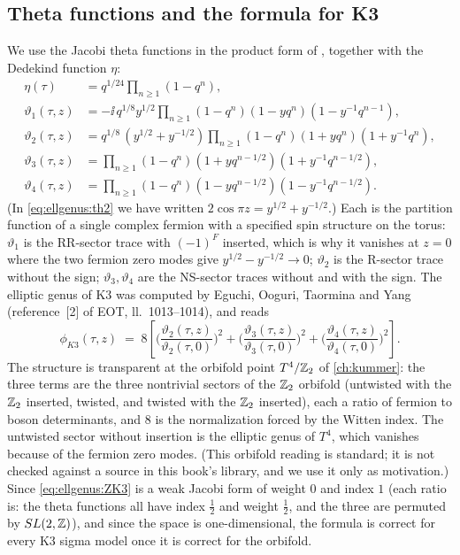 \subsection{Theta functions and the formula for K3}

We use the Jacobi theta functions in the product form of , together with the Dedekind function $\eta$:
\begin{align}
 \eta(\tau)&=q^{1/24}\prod_{n\ge1}(1-q^n),\label{eq:ellgenus:eta}\\
 \vartheta_1(\tau,z)&=-\ii\,q^{1/8}y^{1/2}\prod_{n\ge1}(1-q^n)(1-yq^n)(1-y^{-1}q^{n-1}),
   \label{eq:ellgenus:th1}\\
 \vartheta_2(\tau,z)&=q^{1/8}\,(y^{1/2}+y^{-1/2})\prod_{n\ge1}(1-q^n)(1+yq^n)(1+y^{-1}q^n),
   \label{eq:ellgenus:th2}\\
 \vartheta_3(\tau,z)&=\prod_{n\ge1}(1-q^n)(1+yq^{n-1/2})(1+y^{-1}q^{n-1/2}),\label{eq:ellgenus:th3}\\
 \vartheta_4(\tau,z)&=\prod_{n\ge1}(1-q^n)(1-yq^{n-1/2})(1-y^{-1}q^{n-1/2}).\label{eq:ellgenus:th4}
\end{align}
(In \eqref{eq:ellgenus:th2} we have written $2\cos\pi z=y^{1/2}+y^{-1/2}$.) Each is the
partition function of a single complex fermion with a specified spin structure on the torus:
$\vartheta_1$ is the RR-sector trace with $(-1)^F$ inserted, which is why it vanishes at $z=0$
where the two fermion zero modes give $y^{1/2}-y^{-1/2}\to0$; $\vartheta_2$ is the R-sector
trace without the sign; $\vartheta_3,\vartheta_4$ are the NS-sector traces without and with
the sign. The elliptic genus of K3 was computed by Eguchi, Ooguri, Taormina and Yang
(reference~[2] of EOT, ll.~1013--1014), and reads 
\begin{equation}\label{eq:ellgenus:ZK3}
 \phi_{K3}(\tau,z)\;=\;8\left[\Big(\frac{\vartheta_2(\tau,z)}{\vartheta_2(\tau,0)}\Big)^2
   +\Big(\frac{\vartheta_3(\tau,z)}{\vartheta_3(\tau,0)}\Big)^2
   +\Big(\frac{\vartheta_4(\tau,z)}{\vartheta_4(\tau,0)}\Big)^2\right].
\end{equation}
The structure is transparent at the orbifold point $T^4/\mathbb{Z}_2$ of \cref{ch:kummer}: the three
terms are the three nontrivial sectors of the $\mathbb{Z}_2$ orbifold (untwisted with the $\mathbb{Z}_2$
inserted, twisted, and twisted with the $\mathbb{Z}_2$ inserted), each a ratio of fermion to boson
determinants, and $8$ is the normalization forced by the Witten index. The untwisted
sector without insertion is the elliptic genus of $T^4$, which vanishes because of the
fermion zero modes. (This orbifold reading is standard; it is not checked against a source
in this book's library, and we use it only as motivation.) Since \eqref{eq:ellgenus:ZK3} is a weak Jacobi form of weight $0$ and
index $1$ (each ratio is: the theta functions all have index $\tfrac12$ and weight
$\tfrac12$, and the three are permuted by $SL(2,\mathbb{Z})$), and since the space is one-dimensional, the
formula is correct for every K3 sigma model once it is correct for the orbifold.

